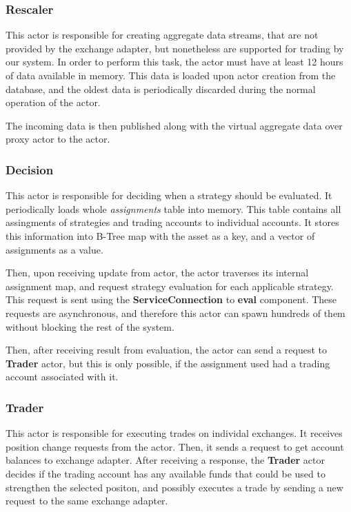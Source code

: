 \subsubsection{Rescaler}
This actor is responsible for creating aggregate data streams, that are not provided
by the exchange adapter, but nonetheless are supported for trading by our system. In order
to perform this task, the actor must have at least 12 hours of data available in memory. This data is loaded upon
actor creation from the database, and the oldest data is periodically discarded during the normal operation of the actor.

The incoming data is then published along with the virtual aggregate data over proxy actor to the  actor.

\subsubsection{Decision}
This actor is responsible for deciding when a strategy should be evaluated. It periodically loads whole
\textit{assignments} table into memory. This table contains all assingments of strategies and trading accounts
to individual accounts. It stores this information into B-Tree map with the asset as a
key, and a vector of assignments as a value.

Then, upon receiving update from  actor, the  actor traverses its internal
assignment map, and request strategy evaluation for each applicable strategy. This request is sent using
the \textbf{ServiceConnection} to \textbf{eval} component. These requests are asynchronous, and therefore
this actor can spawn hundreds of them without blocking the rest of the system.

Then, after receiving result from evaluation, the actor can send a request to \textbf{Trader} actor,
but this is only possible, if the assignment used had a trading account associated with it.

\subsubsection{Trader}
This actor is responsible for executing trades on individal exchanges. It receives position change requests from the 
actor. Then, it sends a request to get account balances to exchange adapter. After receiving a response, the
\textbf{Trader} actor decides if the trading account has any available funds that could be used to strengthen
the selected positon, and possibly executes a trade by sending a new request to the same exchange adapter.

